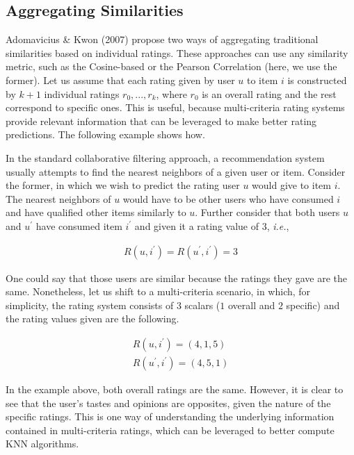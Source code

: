 \documentclass[sigconf,authordraft]{acmart}
\begin{document}
\subsection{Aggregating Similarities}
\label{sec:similarities}

Adomavicius \& Kwon (2007) propose two ways of aggregating traditional similarities based on individual ratings. These approaches can use any similarity metric, such as the Cosine-based or the Pearson Correlation (here, we use the former). Let us assume that each rating given by user $u$ to item $i$ is constructed by $k + 1$ individual ratings $r_0, ..., r_k$, where $r_0$ is an overall rating and the rest correspond to specific ones. This is useful, because multi-criteria rating systems provide relevant information that can be leveraged to make better rating predictions. The following example shows how.

In the standard collaborative filtering approach, a recommendation system usually attempts to find the nearest neighbors of a given user or item. Consider the former, in which we wish to predict the rating user $u$ would give to item $i$. The nearest neighbors of $u$ would have to be other users who have consumed $i$ and have qualified other items similarly to $u$. Further consider that both users $u$ and $u^\prime$ have consumed item $i^\prime$ and given it a rating value of $3$, \textit{i.e.},

\begin{align}
    R(u, i^\prime) = R(u^\prime, i^\prime) = 3
\end{align}

One could say that those users are similar because the ratings they gave are the same. Nonetheless, let us shift to a multi-criteria scenario, in which, for simplicity, the rating system consists of $3$ scalars ($1$ overall and $2$ specific) and the rating values given are the following.

\begin{align}
    R(u, i^\prime) = (4, 1, 5) \\
    R(u^\prime, i^\prime) = (4, 5, 1)
\end{align}

In the example above, both overall ratings are the same. However, it is clear to see that the user's tastes and opinions are opposites, given the nature of the specific ratings. This is one way of understanding the underlying information contained in multi-criteria ratings, which can be leveraged to better compute KNN algorithms.
\end{document}
